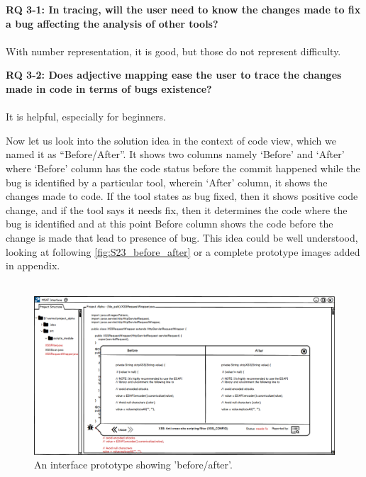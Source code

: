 \begin{myboxi}{{\textbf{RQ 3-1: In tracing, will the user need to know the changes made to fix a bug affecting the analysis of other tools?}}}
\\ \\ With number representation, it is good, but those do not represent difficulty.
\end{myboxi}

\begin{myboxi} {{\textbf{RQ 3-2: Does adjective mapping ease the user to trace the changes made in code in terms of bugs existence?}}}
\\ \\ It is helpful, especially for beginners.
\end{myboxi}
	
Now let us look into the solution idea in the context of code view, which we named it as “Before/After”. It shows two columns namely ‘Before’ and ‘After’ where ‘Before’ column has the code status before the commit happened while the bug is identified by a particular tool, wherein ‘After’ column, it shows the changes made to code. If the tool states as bug fixed, then it shows positive code change, and if the tool says it needs fix, then it determines the code where the bug is identified and at this point Before column shows the code before the change is made that lead to presence of bug. This idea could be well understood, looking at following \autoref{fig:S23_before_after} or a complete prototype images added in appendix. \\ \\


\begin{figure}[hbt!]
	\centering
	\includegraphics[width=\linewidth]{figures/solution_ideas_snaps/S23_before_after}
	\caption{An interface prototype showing 'before/after'.}
	\label{fig:S23_before_after}
\end{figure}

